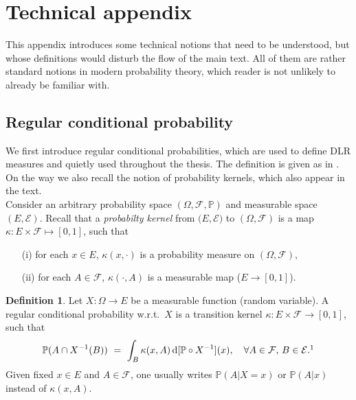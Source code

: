 \documentclass[12pt]{article}
\renewcommand{\d}{\mathrm{d}}
\newcommand{\F}{\mathcal{F}}
\renewcommand{\P}{\mathbb{P}}
\newcommand{\set}[1]{\left\{#1\right\}}
\newcommand{\ra}{\rightarrow}
\newcommand{\pika}{\boldsymbol{\cdot}}
\newcommand{\1}{\mathbbm{1}}
\newcommand{\5}{\vspace{0.5cm}}
\theoremstyle{definition}
\newtheorem{df}[thm]{Definition}
\begin{document}
\pagebreak




\appendix

\section{Technical appendix}

This appendix introduces some technical notions that need to be understood, but whose definitions would disturb the flow of the main text. All of them are rather standard notions in modern probability theory, which reader is not unlikely to already be familiar with.


\subsection{Regular conditional probability}\label{app:1}

We first introduce regular conditional probabilities, which are used to define DLR measures and quietly used throughout the thesis. The definition is given as in \cite{LFR}. On the way we also recall the notion of probability kernels, which also appear in the text. \\

Consider an arbitrary probability space $(\Omega,\F,\P)$ and measurable space $(E,\mathcal{E})$. Recall that a \textit{probabilty kernel} from $(E,\mathcal{E)}$ to $(\Omega,\F)$ is a map $\kappa:E\times\F\mapsto[0,1]$, such that
\begin{itemize}
	\item[(i)] for each $x\in E$, $\kappa(x,\pika)$ is a probability measure on $(\Omega,\F)$,
	\item[(ii)] for each $A\in\F$, $\kappa(\pika,A)$ is a measurable map ($E\ra[0,1]$).
\end{itemize}

\begin{df}
Let $X:\Omega\ra E$ be a measurable function (random variable). A regular conditional probability w.r.t.~$X$ is a transition kernel $\kappa:E\times\F\ra[0,1]$, such that
$$\P(A\cap X^{-1}(B)) ~=~ \int_B \kappa(x,A)\,\d[\P\circ X^{-1}](x), \quad \forall A\in\F,\,B\in\mathcal{E}.\footnote{Instead of $\P(A\cap X^{-1}(B))$, one could also write $\P(A\cap\set{X\in B})$ or $\P(A~\text{and}~X\in B)$.}$$ 
Given fixed $x\in E$ and $A\in\F$, one usually writes $\P(A|X=x)$ or $\P(A|x)$ instead of $\kappa(x,A)$.
\end{df}
\end{document}
